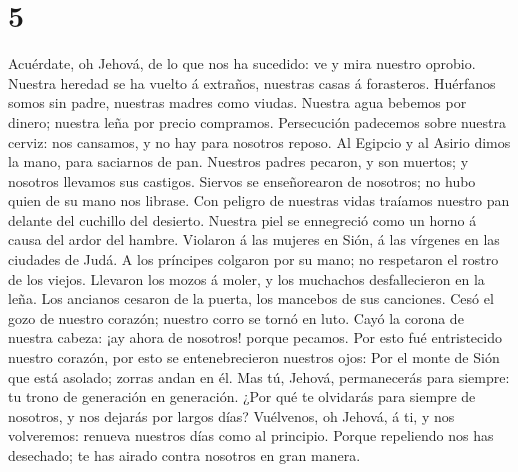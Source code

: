 \hypertarget{section-4}{%
\section{5}\label{section-4}}

 Acuérdate, oh Jehová, de lo que nos ha sucedido: ve y
mira nuestro oprobio.  Nuestra heredad se ha vuelto á
extraños, nuestras casas á forasteros.  Huérfanos somos
sin padre, nuestras madres como viudas.  Nuestra agua
bebemos por dinero; nuestra leña por precio compramos. 
Persecución padecemos sobre nuestra cerviz: nos cansamos, y no hay para
nosotros reposo.  Al Egipcio y al Asirio dimos la mano,
para saciarnos de pan.  Nuestros padres pecaron, y son
muertos; y nosotros llevamos sus castigos.  Siervos se
enseñorearon de nosotros; no hubo quien de su mano nos librase.
 Con peligro de nuestras vidas traíamos nuestro pan
delante del cuchillo del desierto.  Nuestra piel se
ennegreció como un horno á causa del ardor del hambre. 
Violaron á las mujeres en Sión, á las vírgenes en las ciudades de Judá.
 A los príncipes colgaron por su mano; no respetaron el
rostro de los viejos.  Llevaron los mozos á moler, y los
muchachos desfallecieron en la leña.  Los ancianos
cesaron de la puerta, los mancebos de sus canciones. 
Cesó el gozo de nuestro corazón; nuestro corro se tornó en luto.
 Cayó la corona de nuestra cabeza: ¡ay ahora de nosotros!
porque pecamos.  Por esto fué entristecido nuestro
corazón, por esto se entenebrecieron nuestros ojos:  Por
el monte de Sión que está asolado; zorras andan en él. 
Mas tú, Jehová, permanecerás para siempre: tu trono de generación en
generación.  ¿Por qué te olvidarás para siempre de
nosotros, y nos dejarás por largos días?  Vuélvenos, oh
Jehová, á ti, y nos volveremos: renueva nuestros días como al principio.
 Porque repeliendo nos has desechado; te has airado
contra nosotros en gran manera.
